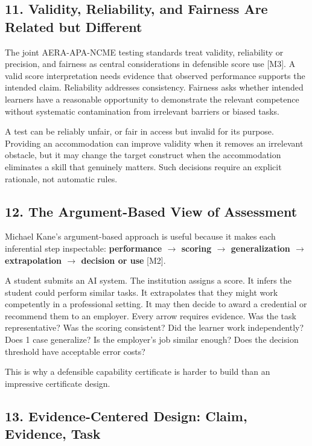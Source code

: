 \subsection*{11. Validity, Reliability, and Fairness Are Related but Different}

The joint AERA-APA-NCME testing standards treat validity, reliability or precision, and fairness as central considerations in defensible score use [M3]. A valid score interpretation needs evidence that observed performance supports the intended claim. Reliability addresses consistency. Fairness asks whether intended learners have a reasonable opportunity to demonstrate the relevant competence without systematic contamination from irrelevant barriers or biased tasks.

A test can be reliably unfair, or fair in access but invalid for its purpose. Providing an accommodation can improve validity when it removes an irrelevant obstacle, but it may change the target construct when the accommodation eliminates a skill that genuinely matters. Such decisions require an explicit rationale, not automatic rules.

\subsection*{12. The Argument-Based View of Assessment}

Michael Kane's argument-based approach is useful because it makes each inferential step inspectable: \textbf{performance $\to$ scoring $\to$ generalization $\to$ extrapolation $\to$ decision or use} [M2].

A student submits an AI system. The institution assigns a score. It infers the student could perform similar tasks. It extrapolates that they might work competently in a professional setting. It may then decide to award a credential or recommend them to an employer. Every arrow requires evidence. Was the task representative? Was the scoring consistent? Did the learner work independently? Does 1 case generalize? Is the employer's job similar enough? Does the decision threshold have acceptable error costs?

This is why a defensible capability certificate is harder to build than an impressive certificate design.

\subsection*{13. Evidence-Centered Design: Claim, Evidence, Task}

